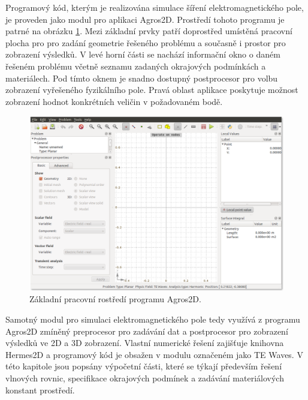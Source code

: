 Programový kód, kterým je realizována simulace šíření elektromagnetického pole, je proveden jako modul pro aplikaci Agros2D. Prostředí tohoto programu je patrné na obrázku \ref{obr:sim_agros2d}. Mezi základní prvky patří doprostřed umístěná pracovní plocha pro pro zadání geometrie řešeného problému a současně i prostor pro zobrazení výsledků. V levé horní části se nachází informační okno o daném řešeném problému včetně seznamu zadaných okrajových podmínkách a materiálech. Pod tímto oknem je snadno dostupný postprocesor pro volbu zobrazení vyřešeného fyzikálního pole. Pravá oblast aplikace poskytuje možnost zobrazení hodnot konkrétních veličin v požadovaném bodě.

\begin{figure}[!h]
	\centering
	\includegraphics[width=14cm]{sim_agros2d.png}
	\caption{Základní pracovní rostředí programu Agros2D.}
	\label{obr:sim_agros2d}
\end{figure}

Samotný modul pro simulaci elektromagnetického pole tedy využívá z programu Agros2D zmíněný preprocesor pro zadávání dat a postprocesor pro zobrazení výsledků ve 2D a 3D zobrazení. Vlastní numerické řešení zajišťuje knihovna Hermes2D a programový kód je obsažen v modulu  označeném jako TE Waves. V této kapitole jsou popsány výpočetní části, které se týkají především řešení vlnových rovnic, specifikace okrajových podmínek a zadávání materiálových konstant prostředí. 

